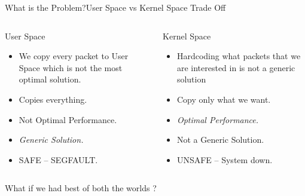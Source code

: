 \documentclass{beamer}
\begin{document}
\begin{frame}{What is the Problem?}{User Space vs Kernel Space Trade Off}
\begin{columns}
\begin{column}{0.5\textwidth}
\begin{center}
User Space
\end{center}
\begin{itemize}
    \item We copy every packet to User Space which is not the most optimal solution.
    \item Copies everything.
    \item \alert{Not Optimal Performance.}
    \item \emph{Generic Solution.}
    \item SAFE -- SEGFAULT.
\end{itemize}
      
\end{column}

\begin{column}{0.5\textwidth}
\begin{center}
Kernel Space
\end{center}
\begin{itemize}
    \item Hardcoding what packets that we are interested in is not a generic solution
    \item Copy only what we want.
    \item \emph{Optimal Performance.}
    \item \alert{Not a Generic Solution.}
    \item \alert{UNSAFE} -- System down.
\end{itemize}
      
\end{column}

\end{columns}
\vspace{5mm}
\pause

\begin{exampleblock}{}
  {\large What if we had best of both the worlds ?}
  \vskip1mm
  \hspace*{}
\end{exampleblock}
\end{frame}
\end{document}
